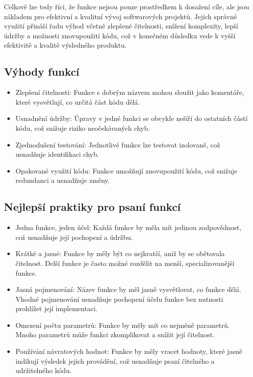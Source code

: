\documentclass{article}
\begin{document}
\begin{Čistý kód - Funkce}
        Celkově lze tedy říci, že funkce nejsou pouze prostředkem k dosažení cíle, ale jsou základem pro efektivní a kvalitní vývoj softwarových projektů.
        Jejich správné využití přináší řadu výhod včetně zlepšené čitelnosti, snížení komplexity, lepší údržby a možnosti znovupoužití kódu, což v konečném důsledku vede k vyšší efektivitě a kvalitě výsledného produktu.

        \subsection{Výhody funkcí}\label{subsec:vyhody-funkci}
        \begin{itemize}
            \item Zlepšení čitelnosti: Funkce s dobrým názvem mohou sloužit jako komentáře, které vysvětlují, co určitá část kódu dělá.
            \item Usnadnění údržby: Úpravy v jedné funkci se obvykle nešíří do ostatních částí kódu, což snižuje riziko neočekávaných chyb.
            \item Zjednodušení testování: Jednotlivé funkce lze testovat izolovaně, což usnadňuje identifikaci chyb.
            \item Opakované využití kódu: Funkce umožňují znovupoužití kódu, což snižuje redundanci a usnadňuje změny.
        \end{itemize}

        \subsection{Nejlepší praktiky pro psaní funkcí}\label{subsec:nejlepsi-praktiky-pro-psani-funkci}
        \begin{itemize}
            \item Jedna funkce, jeden účel: Každá funkce by měla mít jedinou zodpovědnost, což usnadňuje její pochopení a údržbu.
            \item Krátké a jasné: Funkce by měly být co nejkratší, aniž by se obětovala čitelnost.
            Delší funkce je často možné rozdělit na menší, specializovanější funkce.
            \item Jasná pojmenování: Název funkce by měl jasně vysvětlovat, co funkce dělá.
            Vhodné pojmenování usnadňuje pochopení účelu funkce bez nutnosti prohlížet její implementaci.
            \item Omezení počtu parametrů: Funkce by měly mít co nejméně parametrů.
            Mnoho parametrů může funkci zkomplikovat a snížit její čitelnost.
            \item Používání návratových hodnot: Funkce by měly vracet hodnoty, které jasně indikují výsledek jejich provádění, což usnadňuje psaní čitelného a udržitelného kódu.
        \end{itemize}


\end{Čistý kód - Funkce}
\end{document}
